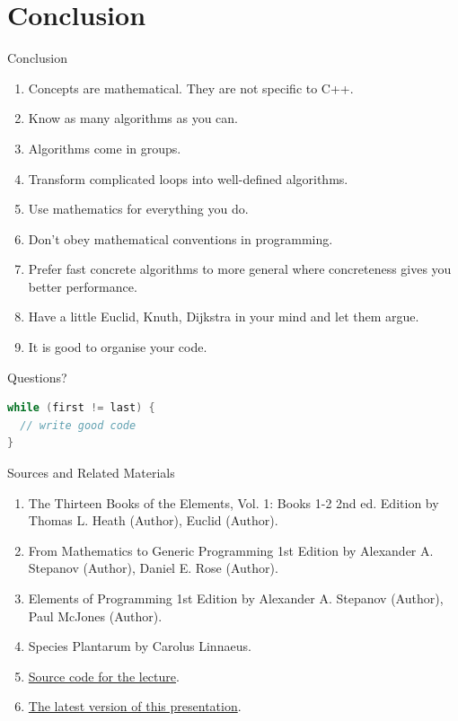 \documentclass[10pt]{beamer}
\begin{document}
\section{Conclusion}
\begin{frame}{Conclusion}
  \begin{enumerate}
    \item Concepts are mathematical. They are not specific to C++.
    \item Know as many algorithms as you can.
    \item Algorithms come in groups.
    \item Transform complicated loops into well-defined algorithms.
    \item Use mathematics for everything you do.
    \item Don't obey mathematical conventions in programming.
    \item Prefer fast concrete algorithms to more general where concreteness gives you better performance.
    \item Have a little Euclid, Knuth, Dijkstra in your mind and let them argue.
    \item It is good to organise your code.
  \end{enumerate}
\end{frame}

\begin{frame}[fragile]{Questions?}
\begin{lstlisting}[language=C++,basicstyle=\huge]
while (first != last) {
  // write good code
}
\end{lstlisting}
\end{frame}

\begin{frame}{Sources and Related Materials}
  \begin{enumerate}
    \item The Thirteen Books of the Elements, Vol. 1: Books 1-2 2nd ed. Edition by Thomas L. Heath (Author), Euclid (Author).
    \item From Mathematics to Generic Programming 1st Edition by Alexander A. Stepanov (Author), Daniel E. Rose (Author).
    \item Elements of Programming 1st Edition by Alexander A. Stepanov (Author), Paul McJones (Author).
    \item Species Plantarum by Carolus Linnaeus.
    \item \href{https://github.com/tshev/tshev.github.io/tree/master/files/presentations/CppCon/2019/6-algorithmic-journeys-with-concepts/code}{Source code for the lecture}.
    \item \href{https://github.com/tshev/tshev.github.io/blob/master/files/presentations/CppCon/2019/6-algorithmic-journeys-with-concepts/demo.pdf}{The latest version of this presentation}.
  \end{enumerate}
\end{frame}
\end{document}
